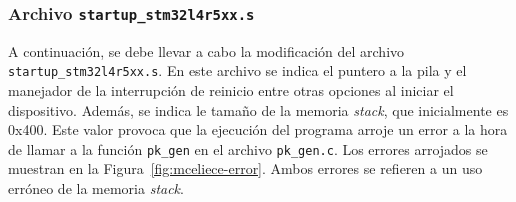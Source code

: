 \subsubsection{Archivo \texttt{startup\_stm32l4r5xx.s}}\label{subsubsec:mceliece-startup}

A continuación, se debe llevar a cabo la modificación del archivo \texttt{startup\_stm32l4r5xx.s}.
En este archivo se indica el puntero a la pila y el manejador de la interrupción de reinicio entre otras opciones al iniciar el dispositivo.
Además, se indica le tamaño de la memoria \textit{stack}, que inicialmente es 0x400.
Este valor provoca que la ejecución del programa arroje un error a la hora de llamar a la función \texttt{pk\_gen} en el archivo \texttt{pk\_gen.c}.
Los errores arrojados se muestran en la Figura~\ref{fig:mceliece-error}.
Ambos errores se refieren a un uso erróneo de la memoria \textit{stack}.

